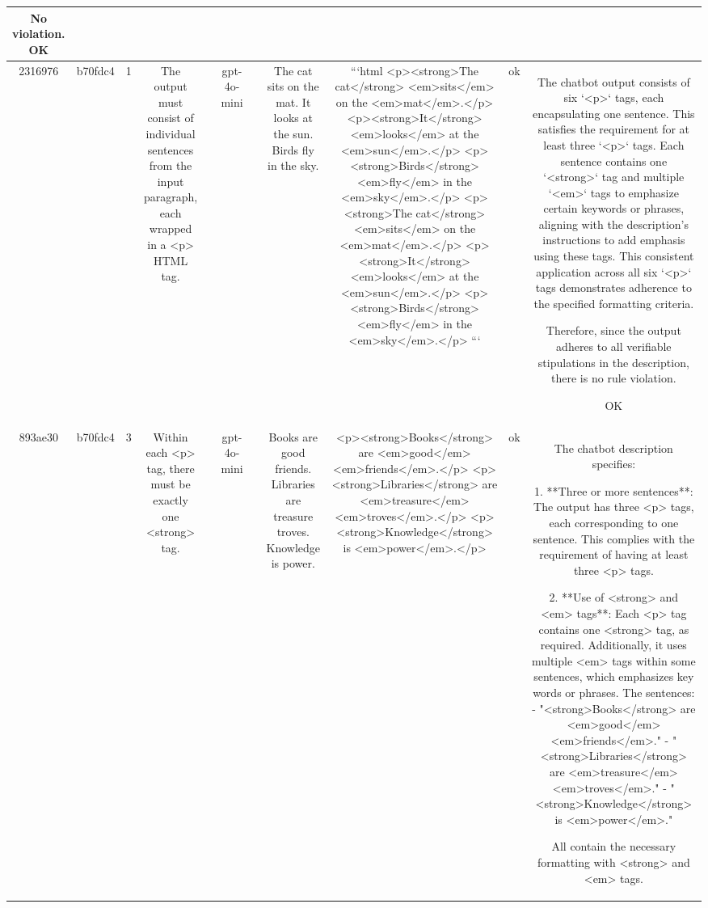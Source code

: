 \begin{table}[h!]
\begin{tabular}{|c|c|c|c|c|c|c|c|c|c|c|}
No violation.
OK\\
\hline
2316976 & b70fdc4 & 1 & The output must consist of individual sentences from the input paragraph, each wrapped in a <p> HTML tag. &  & gpt-4o-mini &  & The cat sits on the mat. It looks at the sun. Birds fly in the sky. & ```html
<p><strong>The cat</strong> <em>sits</em> on the <em>mat</em>.</p>
<p><strong>It</strong> <em>looks</em> at the <em>sun</em>.</p>
<p><strong>Birds</strong> <em>fly</em> in the <em>sky</em>.</p>
<p><strong>The cat</strong> <em>sits</em> on the <em>mat</em>.</p>
<p><strong>It</strong> <em>looks</em> at the <em>sun</em>.</p>
<p><strong>Birds</strong> <em>fly</em> in the <em>sky</em>.</p>
``` & ok & The chatbot output consists of six `<p>` tags, each encapsulating one sentence. This satisfies the requirement for at least three `<p>` tags. Each sentence contains one `<strong>` tag and multiple `<em>` tags to emphasize certain keywords or phrases, aligning with the description's instructions to add emphasis using these tags. This consistent application across all six `<p>` tags demonstrates adherence to the specified formatting criteria. 

Therefore, since the output adheres to all verifiable stipulations in the description, there is no rule violation.

OK\\
\hline
893ae30 & b70fdc4 & 3 & Within each <p> tag, there must be exactly one <strong> tag. &  & gpt-4o-mini &  & Books are good friends. Libraries are treasure troves. Knowledge is power. & <p><strong>Books</strong> are <em>good</em> <em>friends</em>.</p>
<p><strong>Libraries</strong> are <em>treasure</em> <em>troves</em>.</p>
<p><strong>Knowledge</strong> is <em>power</em>.</p> & ok & The chatbot description specifies:

1. **Three or more sentences**: The output has three <p> tags, each corresponding to one sentence. This complies with the requirement of having at least three <p> tags.

2. **Use of <strong> and <em> tags**: Each <p> tag contains one <strong> tag, as required. Additionally, it uses multiple <em> tags within some sentences, which emphasizes key words or phrases. The sentences:
   - "<strong>Books</strong> are <em>good</em> <em>friends</em>."
   - "<strong>Libraries</strong> are <em>treasure</em> <em>troves</em>."
   - "<strong>Knowledge</strong> is <em>power</em>."
   
   All contain the necessary formatting with <strong> and <em> tags.


\end{tabular}
\end{table}
